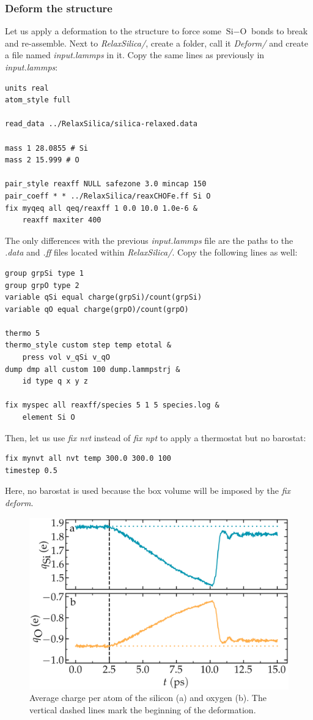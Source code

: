 \documentclass[9pt,tutorial]{livecoms}
\begin{document}
\subsubsection{Deform the structure}
Let us apply a deformation to the structure to force some $\text{Si}-\text{O}$ bonds to break and re-assemble. Next to \textit{RelaxSilica/}, create a folder, call it \textit{Deform/} and create a file named \textit{input.lammps} in it. Copy the same lines as previously in \textit{input.lammps}:
{\normalsize \begin{verbatim}
units real
atom_style full

read_data ../RelaxSilica/silica-relaxed.data

mass 1 28.0855 # Si
mass 2 15.999 # O

pair_style reaxff NULL safezone 3.0 mincap 150
pair_coeff * * ../RelaxSilica/reaxCHOFe.ff Si O
fix myqeq all qeq/reaxff 1 0.0 10.0 1.0e-6 &
    reaxff maxiter 400
\end{verbatim}}
The only differences with the previous \textit{input.lammps} file are the paths to the \textit{.data} and \textit{.ff} files located within \textit{RelaxSilica/}. Copy the following lines as well:
{\normalsize \begin{verbatim}
group grpSi type 1
group grpO type 2
variable qSi equal charge(grpSi)/count(grpSi)
variable qO equal charge(grpO)/count(grpO)

thermo 5
thermo_style custom step temp etotal &
    press vol v_qSi v_qO
dump dmp all custom 100 dump.lammpstrj &
    id type q x y z

fix myspec all reaxff/species 5 1 5 species.log &
    element Si O
\end{verbatim}}
Then, let us use \textit{fix nvt} instead of \textit{fix npt} to apply a thermostat but no barostat:
{\normalsize \begin{verbatim}
fix mynvt all nvt temp 300.0 300.0 100
timestep 0.5
\end{verbatim}}
Here, no barostat is used because the box volume will be imposed by the \textit{fix deform}.

\begin{figure}
\includegraphics[width=\linewidth]{SIO-deformed-charge}
\caption{Average charge per atom of the silicon (a) and oxygen (b). The vertical dashed lines mark the beginning of the deformation.}
\label{fig:SIO-deformed-charge}
\end{figure}
\end{document}
